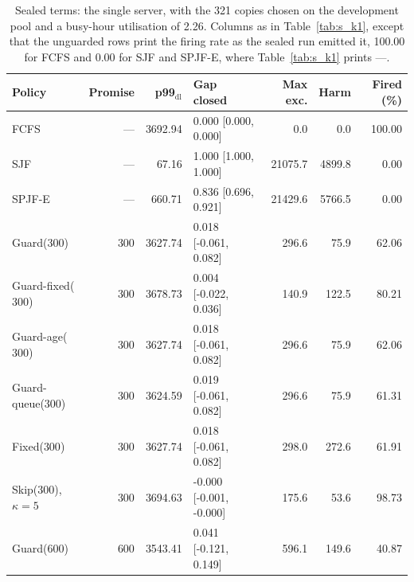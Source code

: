 \documentclass[mathematics,supfile,submit,moreauthors]{Definitions/mdpi}
\newcommand{\sealednum}[1]{#1}
\begin{document}
\begin{table}[htbp]
\centering
\caption{Sealed terms: the single server, with the 321 copies chosen on the development pool and a busy-hour utilisation of 2.26. Columns as in Table~\ref{tab:s_k1}, except that the unguarded rows print the firing rate as the sealed run emitted it, \sealednum{100.00} for FCFS and \sealednum{0.00} for SJF and SPJF-E, where Table~\ref{tab:s_k1} prints ---.}
\label{tab:k1_sealed}
\small
\setlength{\tabcolsep}{3pt}
\begin{tabular}{lrrlrrr}
\toprule
Policy & Promise & p99$_{\mathrm{dl}}$ & Gap closed & Max exc. & Harm & Fired (\%) \\
\midrule
FCFS                         & --- & \sealednum{3692.94} & \sealednum{0.000 [0.000, 0.000]} & \sealednum{0.0} & \sealednum{0.0} & \sealednum{100.00} \\
SJF                          & --- & \sealednum{67.16} & \sealednum{1.000 [1.000, 1.000]} & \sealednum{21075.7} & \sealednum{4899.8} & \sealednum{0.00} \\
SPJF-E                       & --- & \sealednum{660.71} & \sealednum{0.836 [0.696, 0.921]} & \sealednum{21429.6} & \sealednum{5766.5} & \sealednum{0.00} \\
Guard($\sealednum{300}$)        & \sealednum{300} & \sealednum{3627.74} & \sealednum{0.018 [-0.061, 0.082]} & \sealednum{296.6} & \sealednum{75.9} & \sealednum{62.06} \\
Guard-fixed($\sealednum{300}$)  & \sealednum{300} & \sealednum{3678.73} & \sealednum{0.004 [-0.022, 0.036]} & \sealednum{140.9} & \sealednum{122.5} & \sealednum{80.21} \\
Guard-age($\sealednum{300}$)    & \sealednum{300} & \sealednum{3627.74} & \sealednum{0.018 [-0.061, 0.082]} & \sealednum{296.6} & \sealednum{75.9} & \sealednum{62.06} \\
Guard-queue($\sealednum{300}$)  & \sealednum{300} & \sealednum{3624.59} & \sealednum{0.019 [-0.061, 0.082]} & \sealednum{296.6} & \sealednum{75.9} & \sealednum{61.31} \\
Fixed($\sealednum{300}$)        & \sealednum{300} & \sealednum{3627.74} & \sealednum{0.018 [-0.061, 0.082]} & \sealednum{298.0} & \sealednum{272.6} & \sealednum{61.91} \\
Skip($\sealednum{300}$), $\kappa=5$ & \sealednum{300} & \sealednum{3694.63} & \sealednum{-0.000 [-0.001, -0.000]} & \sealednum{175.6} & \sealednum{53.6} & \sealednum{98.73} \\
Guard($\sealednum{600}$)        & \sealednum{600} & \sealednum{3543.41} & \sealednum{0.041 [-0.121, 0.149]} & \sealednum{596.1} & \sealednum{149.6} & \sealednum{40.87} \\

\end{tabular}
\end{table}
\end{document}
